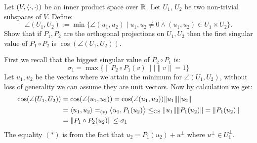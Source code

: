 \documentclass[11pt, a4paper]{article}
\begin{document}
\begin{exercise}
  Let $(V, \left\langle \cdot, \cdot \right\rangle)$ be an inner product space over $\mathbb{R}$.
  Let $U_1$, $U_2$ be two non-trivial subspaces of $V$. Define:
  \[
    \angle(U_1,U_2) := 
    \min\{\angle(u_1,u_2) \mid 
    u_1,u_2 \neq 0 \land (u_1,u_2)\in U_1 \times U_2\}.
  \]
  Show that if $P_1,P_2$ are the orthogonal projections on $U_1,U_2$ then
  the first singular value of $P_1 \circ P_2$ is $\cos(\angle (U_1,U_2))$.
\end{exercise}
\begin{solution}
  First we recall that the biggest singular value of $P_2 \circ P_1$ is:
  \[
    \sigma_1 = \max\{\|P_2 \circ P_1 (v)\| \mid \|v\| = 1\}
  \]
  Let $u_1, u_2$ be the vectors where we attain the minimum for $\angle (U_1,U_2)$,
  without loss of generality we can assume they are unit vectors. Now by calculation
  we get:
  \begin{align*}
    \cos(\angle (U_1,U_2)) &= 
    \cos(\angle (u_1,u_2)) = 
    \cos(\angle (u_1,u_2))\|u_1\|\|u_2\| \\ &=
    \left\langle u_1, u_2 \right\rangle =_{(*)}
    \left\langle u_1, P_1(u_2) \right\rangle \le_{\mathrm{CS}}
    \|u_1\|\|P_1(u_2)\| = 
    \|P_1(u_2)\| \\ &= 
    \|P_1 \circ P_2 (u_2)\| \le \sigma_1
  \end{align*}
  The equality $(*)$ is from the fact that $u_2 = P_1(u_2) + u^\perp$ where
  $u^\perp \in U_1^\perp$.
\end{solution}
\end{document}
